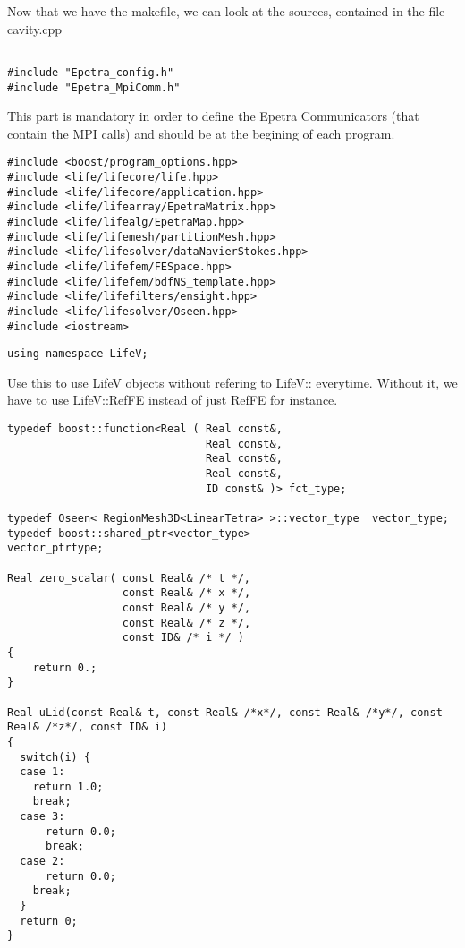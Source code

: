 Now that we have the makefile, we can look at the sources, contained in the file cavity.cpp


\begin{verbatim}

#include "Epetra_config.h"
#include "Epetra_MpiComm.h"

\end{verbatim}

This part is mandatory in order to define the Epetra Communicators (that contain the MPI calls) 
 and should be
at the begining of each program.


\begin{verbatim}
#include <boost/program_options.hpp>
#include <life/lifecore/life.hpp>
#include <life/lifecore/application.hpp>
#include <life/lifearray/EpetraMatrix.hpp>
#include <life/lifealg/EpetraMap.hpp>
#include <life/lifemesh/partitionMesh.hpp>
#include <life/lifesolver/dataNavierStokes.hpp>
#include <life/lifefem/FESpace.hpp>
#include <life/lifefem/bdfNS_template.hpp>
#include <life/lifefilters/ensight.hpp>
#include <life/lifesolver/Oseen.hpp>
#include <iostream>
\end{verbatim}



\begin{verbatim}
using namespace LifeV;
\end{verbatim}

Use this to use LifeV objects  without refering to LifeV:: everytime.
Without it, we have to use LifeV::RefFE instead of just RefFE for instance.


\begin{verbatim}
typedef boost::function<Real ( Real const&,
                               Real const&,
                               Real const&,
                               Real const&,
                               ID const& )> fct_type;

typedef Oseen< RegionMesh3D<LinearTetra> >::vector_type  vector_type;
typedef boost::shared_ptr<vector_type>                   vector_ptrtype;

Real zero_scalar( const Real& /* t */,
                  const Real& /* x */,
                  const Real& /* y */,
                  const Real& /* z */,
                  const ID& /* i */ )
{
    return 0.;
}

Real uLid(const Real& t, const Real& /*x*/, const Real& /*y*/, const Real& /*z*/, const ID& i)
{
  switch(i) {
  case 1:
    return 1.0;
    break;
  case 3:
      return 0.0;
      break;
  case 2:
      return 0.0;
    break;
  }
  return 0;
}

\end{verbatim}

